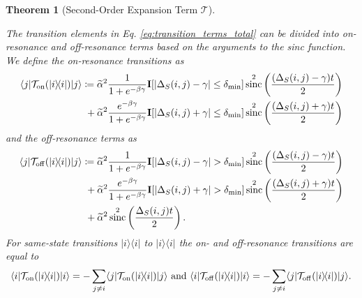 \documentclass{article}
\newtheorem{theorem}{Theorem}
\newcommand{\on}{\rm on}
\newcommand{\off}{\rm off}
\newcommand{\ket}[1]{|#1\rangle}
\newcommand{\bra}[1]{\langle #1|}
\newcommand{\ketbra}[2]{| #1\rangle\! \langle #2|}
\newcommand{\TT}{\mathcal{T}}
\DeclareMathOperator{\sinc}{sinc}
\begin{document}
\begin{theorem}[Second-Order Expansion Term $\mathcal{T}$]
\begin{enumerate}
\end{enumerate}
The transition elements in Eq. \eqref{eq:transition_terms_total} can be divided into on-resonance and off-resonance terms based on the arguments to the sinc function. We define the on-resonance transitions as
\begin{align}
    \bra{j} \TT_{\on}(\ketbra{i}{i})\ket{j} &\coloneqq \widetilde{\alpha}^2 \frac{1}{1 + e^{-\beta \gamma}} \mathbf{I}[|\Delta_S(i,j) - \gamma| \le \delta_{\min}]  \sinc^2\left(\frac{(\Delta_S(i,j) - \gamma)t}{2}\right) \nonumber \\
    &~+ \widetilde{\alpha}^2 \frac{e^{-\beta \gamma}}{1 + e^{-\beta \gamma}} \mathbf{I}[|\Delta_S(i,j) + \gamma| \le \delta_{\min}]  \sinc^2\left(\frac{(\Delta_S(i,j) + \gamma)t}{2}\right) \label{def:on_resonance}
\end{align}
and the off-resonance terms as
\begin{equation}
\begin{split}
    \bra{j} \TT_{\off}(\ketbra{i}{i})\ket{j} &\coloneqq \widetilde{\alpha}^2 \frac{1}{1 + e^{-\beta \gamma}} \mathbf{I}[|\Delta_S(i,j) - \gamma| > \delta_{\min}]  \sinc^2\left(\frac{(\Delta_S(i,j) - \gamma)t}{2}\right)  \\
    &~+ \widetilde{\alpha}^2 \frac{e^{-\beta \gamma}}{1 + e^{-\beta \gamma}} \mathbf{I}[|\Delta_S(i,j) + \gamma| > \delta_{\min}]  \sinc^2\left(\frac{(\Delta_S(i,j) + \gamma)t}{2}\right)  \\
    &~+ \widetilde{\alpha}^2 \sinc^2 \left( \frac{\Delta_S(i,j)t}{2} \right). \label{def:off_resonance}
    \end{split}
\end{equation}
For same-state transitions $\ketbra{i}{i}$ to $\ketbra{i}{i}$ the on- and off-resonance transitions are equal to
\begin{equation}
    \bra{i} \TT_{\on}(\ketbra{i}{i}) \ket{i} = - \sum_{j \neq i}\bra{j} \TT_{\on}(\ketbra{i}{i}) \ket{j} \text{ and } \bra{i} \TT_{\off}(\ketbra{i}{i}) \ket{i} = - \sum_{j \neq i}\bra{j} \TT_{\off}(\ketbra{i}{i}) \ket{j}. \label{eq:same_state_transition_resonances}
\end{equation}
\end{theorem}
\end{document}
